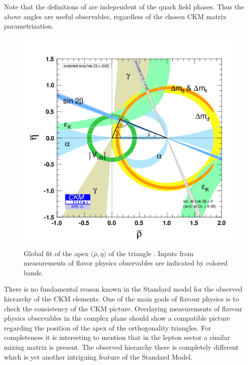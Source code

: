 \noindent Note that the definitions of  are independent of
the quark field phases. Thus the above angles are useful observables, regardless of the chosen
CKM matrix parametrization.

\begin{figure}[!h]
  \centering
    \includegraphics[trim=0cm 0.5cm 0cm 1.5cm, clip=true, width=\textwidth]{Figures/Chapter1/rhoeta_large.png}
    \caption{Global fit of the apex $(\bar{\rho},\bar{\eta)}$ of the \Bd triangle \cite{ckm-fitter-phis-pred}.
             Inputs from measurements of flavor physics observables are indicated by colored bands.}
    \label{unitarity_triangle}
\end{figure}

There is no fundamental reason known in the Standard model for the observed hierarchy of the CKM elements.
One of the main goals of flavour physics is to check the consistency of the CKM picture.
Overlaying measurements of flavour physics observables in the complex plane should show a compatible
picture regarding the position of the apex of the orthogonality triangles.
For completeness it is interesting to mention that in the lepton sector a similar mixing matrix is present.
The observed hierarchy there is completely different which is yet another intriguing feature of the Standard Model.

